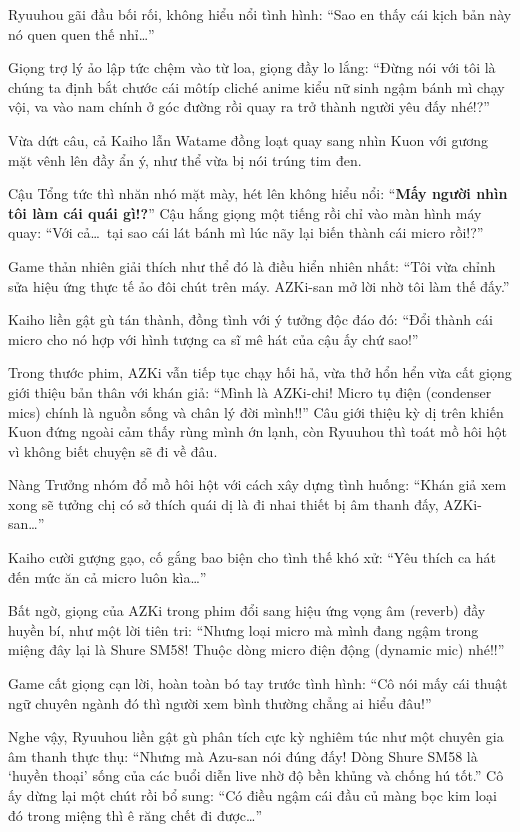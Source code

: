\documentclass[../main.tex]{subfiles}
\begin{document}
Ryuuhou gãi đầu bối rối, không hiểu nổi tình hình: ``Sao en thấy cái kịch bản này nó quen quen thế nhỉ\dots''

Giọng trợ lý ảo lập tức chệm vào từ loa, giọng đầy lo lắng: ``Đừng nói với tôi là chúng ta định bắt chước cái môtíp cliché anime kiểu nữ sinh ngậm bánh mì chạy vội, va vào nam chính ở góc đường rồi quay ra trở thành người yêu đấy nhé!?''

Vừa dứt câu, cả Kaiho lẫn Watame đồng loạt quay sang nhìn Kuon với gương mặt vênh lên đầy ẩn ý, như thể vừa bị nói trúng tim đen.

Cậu Tổng tức thì nhăn nhó mặt mày, hét lên không hiểu nổi: ``\textbf{Mấy người nhìn tôi làm cái quái gì!?}'' Cậu hắng giọng một tiếng rồi chỉ vào màn hình máy quay: ``Với cả\dots\ tại sao cái lát bánh mì lúc nãy lại biến thành cái micro rồi!?''

Game thản nhiên giải thích như thể đó là điều hiển nhiên nhất: ``Tôi vừa chỉnh sửa hiệu ứng thực tế ảo đôi chút trên máy. AZKi-san mở lời nhờ tôi làm thế đấy.''

Kaiho liền gật gù tán thành, đồng tình với ý tưởng độc đáo đó: ``Đổi thành cái micro cho nó hợp với hình tượng ca sĩ mê hát của cậu ấy chứ sao!''

Trong thước phim, AZKi vẫn tiếp tục chạy hối hả, vừa thở hổn hển vừa cất giọng giới thiệu bản thân với khán giả: ``Mình là AZKi-chi! Micro tụ điện (condenser mics) chính là nguồn sống và chân lý đời mình!!'' Câu giới thiệu kỳ dị trên khiến Kuon đứng ngoài cảm thấy rùng mình ớn lạnh, còn Ryuuhou thì toát mồ hôi hột vì không biết chuyện sẽ đi về đâu.

Nàng Trưởng nhóm đổ mồ hôi hột với cách xây dựng tình huống: ``Khán giả xem xong sẽ tưởng chị có sở thích quái dị là đi nhai thiết bị âm thanh đấy, AZKi-san\dots''

Kaiho cười gượng gạo, cố gắng bao biện cho tình thế khó xử: ``Yêu thích ca hát đến mức ăn cả micro luôn kìa\dots''

Bất ngờ, giọng của AZKi trong phim đổi sang hiệu ứng vọng âm (reverb) đầy huyền bí, như một lời tiên tri: ``Nhưng loại micro mà mình đang ngậm trong miệng đây lại là Shure SM58! Thuộc dòng micro điện động (dynamic mic) nhé!!''

Game cất giọng cạn lời, hoàn toàn bó tay trước tình hình: ``Cô nói mấy cái thuật ngữ chuyên ngành đó thì người xem bình thường chẳng ai hiểu đâu!''

Nghe vậy, Ryuuhou liền gật gù phân tích cực kỳ nghiêm túc như một chuyên gia âm thanh thực thụ: ``Nhưng mà Azu-san nói đúng đấy! Dòng Shure SM58 là `huyền thoại' sống của các buổi diễn live nhờ độ bền khủng và chống hú tốt.'' Cô ấy dừng lại một chút rồi bổ sung: ``Có điều ngậm cái đầu củ màng bọc kim loại đó trong miệng thì ê răng chết đi được\dots''
\end{document}

